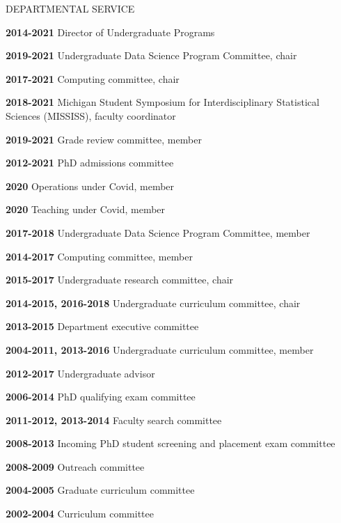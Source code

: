 
\begin{mylist}{DEPARTMENTAL SERVICE}

\item{\bf 2014-2021 } Director of Undergraduate Programs
\item{\bf 2019-2021 } Undergraduate Data Science Program Committee, chair
\item{\bf 2017-2021 } Computing committee, chair
\item{\bf 2018-2021} Michigan Student Symposium for Interdisciplinary Statistical Sciences (MISSISS), faculty coordinator
\item{\bf 2019-2021 } Grade review committee, member  
\item{\bf 2012-2021 } PhD admissions committee
\item{\bf 2020 } Operations under Covid, member
\item{\bf 2020 } Teaching under Covid, member
\item{\bf 2017-2018 } Undergraduate Data Science Program Committee, member  
\item{\bf 2014-2017 } Computing committee, member
\item{\bf 2015-2017 } Undergraduate research committee, chair
\item{\bf 2014-2015, 2016-2018 } Undergraduate curriculum committee, chair
\item{\bf 2013-2015 } Department executive committee
\item{\bf 2004-2011, 2013-2016 } Undergraduate curriculum committee, member
\item{\bf 2012-2017 } Undergraduate advisor
\item{\bf 2006-2014 } PhD qualifying exam committee
\item{\bf 2011-2012, 2013-2014 } Faculty search committee
\item{\bf 2008-2013 } Incoming PhD student screening and placement exam committee
\item{\bf 2008-2009 } Outreach committee
\item{\bf 2004-2005 } Graduate curriculum committee
\item{\bf 2002-2004 } Curriculum committee 
\end{mylist}

\lsp

